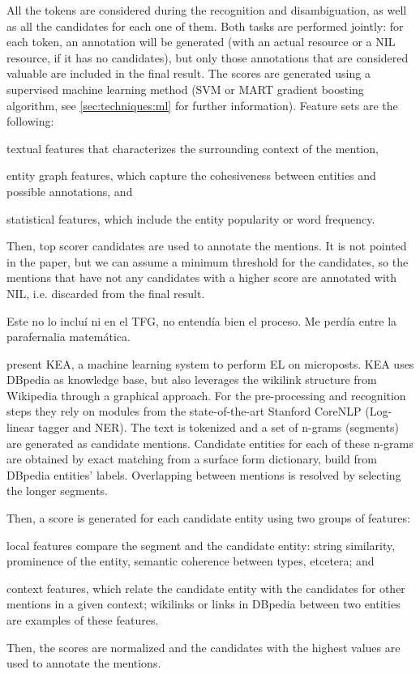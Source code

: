 All the tokens are considered during the recognition and disambiguation, as well as all the candidates for each one of them. Both tasks are performed jointly: for each token, an annotation will be generated (with an actual resource or a NIL resource, if it has no candidates), but only those annotations that are considered valuable are included in the final result. The scores are generated using a supervised machine learning method (SVM or MART gradient boosting algorithm, see \autoref{sec:techniques:ml} for further information). Feature sets are the following:
%
\begin{enumerate*}
	\item textual features that characterizes the surrounding context of the mention,
	\item entity graph features, which capture the cohesiveness between entities and possible annotations, and
	\item statistical features, which include the entity popularity or word frequency.
\end{enumerate*}

Then, top scorer candidates are used to annotate the mentions. It is not pointed in the paper, but we can assume a minimum threshold for the candidates, so the mentions that have not any candidates with a higher score are annotated with NIL, i.e. discarded from the final result.

\medskip

\cite{luo2015}

{\color{red} Este no lo incluí ni en el TFG, no entendía bien el proceso. Me perdía entre la parafernalia matemática.}

\medskip

\cite{waitelonis2016} present KEA, a machine learning system to perform EL on microposts. KEA uses DBpedia as knowledge base, but also leverages the wikilink structure from Wikipedia through a graphical approach. For the pre-processing and recognition steps they rely on modules from the state-of-the-art Stanford CoreNLP (Log-linear tagger and NER). The text is tokenized and a set of n-grams (segments) are generated as candidate mentions. Candidate entities for each of these n-grams are obtained by exact matching from a surface form dictionary, build from DBpedia entities' labels. Overlapping between mentions is resolved by selecting the longer segments.

Then, a score is generated for each candidate entity using two groups of features:
%
\begin{enumerate*}
\item local features compare the segment and the candidate entity: string similarity, prominence of the entity, semantic coherence between types, etcetera; and
\item context features, which relate the candidate entity with the candidates for other mentions in a given context; wikilinks or links in DBpedia between two entities are examples of these features.
\end{enumerate*}
%
Then, the scores are normalized and the candidates with the highest values are used to annotate the mentions.

